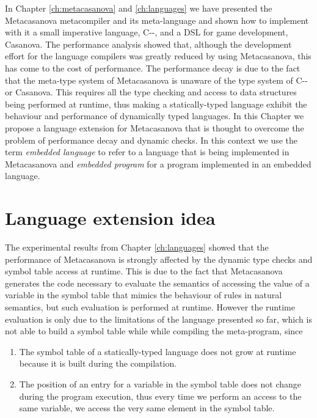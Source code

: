 In Chapter \ref{ch:metacasanova} and \ref{ch:languages} we have presented the Metacasanova metacompiler and its meta-language and shown how to implement with it a small imperative language, C-{}-, and a DSL for game development, Casanova. The performance analysis showed that, although the development effort for the language compilers was greatly reduced by using Metacasanova, this has come to the cost of performance. The performance decay is due to the fact that the meta-type system of Metacasanova is unaware of the type system of C-{}- or Casanova. This requires all the type checking and access to data structures being performed at runtime, thus making a statically-typed language exhibit the behaviour and performance of dynamically typed languages. In this Chapter we propose a language extension \cite{DiGiacomo2017SLE} for Metacasanova that is thought to overcome the problem of performance decay and dynamic checks. In this context we use the term \textit{embedded language} to refer to a language that is being implemented in Metacasanova and \textit{embedded program} for a program implemented in an embedded language.

\section{Language extension idea}
\label{sec:ch_functors_idea}
The experimental results from Chapter \ref{ch:languages} showed that the performance of Metacasanova is strongly affected by the dynamic type checks and symbol table access at runtime. This is due to the fact that Metacasanova generates the code necessary to evaluate the semantics of accessing the value of a variable in the symbol table that mimics the behaviour of rules in natural semantics, but such evaluation is performed at runtime. However the runtime evaluation is only due to the limitations of the language presented so far, which is not able to build a symbol table while while compiling the meta-program, since

\begin{enumerate}
	\item The symbol table of a statically-typed language does not grow at runtime because it is built during the compilation.
	\item The position of an entry for a variable in the symbol table does not change during the program execution, thus every time we perform an access to the same variable, we access the very same element in the symbol table.
\end{enumerate}


